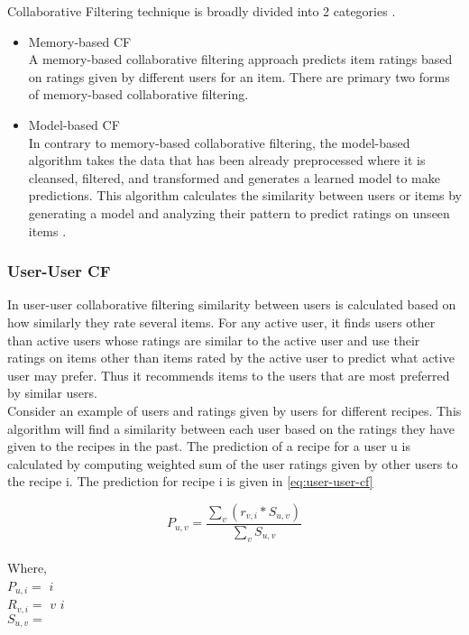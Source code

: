\noindent Collaborative Filtering technique is broadly divided into 2 categories \cite{11}. 
\\
\begin{itemize}
\item Memory-based CF \\
A memory-based collaborative filtering approach predicts item ratings based on ratings given by different users for an item. There are primary two forms of memory-based collaborative filtering. 
\item Model-based CF \\
In contrary to memory-based collaborative filtering, the model-based algorithm takes the data that has been already preprocessed where it is cleansed, filtered, and transformed and generates a learned model to make predictions. This algorithm calculates the similarity between users or items by generating a model and analyzing their pattern to predict ratings on unseen items \cite{28,29,30}.
\end{itemize}

\subsubsection{User-User CF}

In user-user collaborative filtering similarity between users is calculated based on how similarly they rate several items. For any active user, it finds users other than active users whose ratings are similar to the active user and use their ratings on items other than items rated by the active user to predict what active user may prefer. Thus it recommends items to the users that are most preferred by similar users.
\\
Consider an example of users and ratings given by users for different recipes. This algorithm will find a similarity between each user based on the ratings they have given to the recipes in the past. The prediction of a recipe for a user u is calculated by computing weighted sum of the user ratings given by other users to the recipe i.
The prediction for recipe i is given in \autoref{eq:user-user-cf}

\begin{equation}
P_{u,v} = \frac { \sum_v(r_{v,i} * S_{u,v})}{\sum_v S_{u,v}}
\label{eq:user-user-cf}
\end{equation}
\\
Where, 
\\
\noindent
$P_{u,i} = $  $i$ 
\\
$R_{v,i} = $  $v$  $i$ 
\\
$S_{u,v} = $ 
\\

